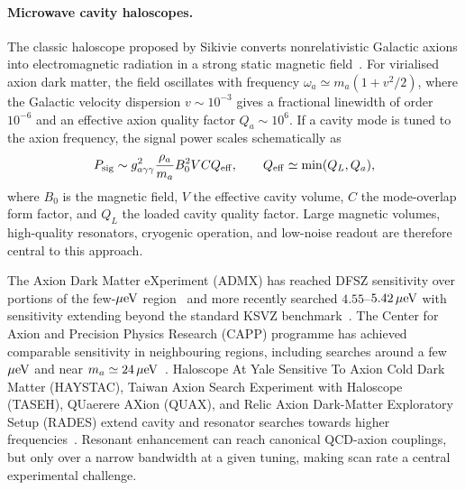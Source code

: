 \documentclass[review]{elsarticle}
\numberwithin{equation}{section}
\numberwithin{table}{section}
\numberwithin{figure}{section}
\begin{document}
\paragraph{Microwave cavity haloscopes.}

The classic haloscope proposed by Sikivie converts nonrelativistic Galactic axions into electromagnetic radiation in a strong static magnetic field~\cite{Sikivie:1983ip,Sikivie:1985yu}. For virialised axion dark matter, the field oscillates with frequency $\omega_a\simeq m_a(1+v^2/2)$, where the Galactic velocity dispersion $v\sim10^{-3}$ gives a fractional linewidth of order $10^{-6}$ and an effective axion quality factor $Q_a\sim10^6$. If a cavity mode is tuned to the axion frequency, the signal power scales schematically as
\begin{align}
    P_{\rm sig}
    \sim
    g_{a\gamma\gamma}^2
    \frac{\rho_a}{m_a}
    B_0^2 V C Q_{\rm eff},
    \qquad
    Q_{\rm eff}\simeq \min(Q_L,Q_a),
    \label{eq:axion-haloscope-power}
\end{align}
where $B_0$ is the magnetic field, $V$ the effective cavity volume, $C$ the mode-overlap form factor, and $Q_L$ the loaded cavity quality factor. Large magnetic volumes, high-quality resonators, cryogenic operation, and low-noise readout are therefore central to this approach.

The Axion Dark Matter eXperiment (ADMX) has reached DFSZ sensitivity over portions of the few-$\mu{\rm eV}$ region~\cite{ADMX:2021nhd} and more recently searched $4.55$--$5.42\,\mu{\rm eV}$ with sensitivity extending beyond the standard KSVZ benchmark~\cite{ADMX:2025vom}. The Center for Axion and Precision Physics Research (CAPP) programme has achieved comparable sensitivity in neighbouring regions, including searches around a few $\mu{\rm eV}$ and near $m_a\simeq24\,\mu{\rm eV}$~\cite{CAPP:2024dtx,Ahn:2025via}. Haloscope At Yale Sensitive To Axion Cold Dark Matter (HAYSTAC), Taiwan Axion Search Experiment with Haloscope (TASEH), QUaerere AXion (QUAX), and Relic Axion Dark-Matter Exploratory Setup (RADES) extend cavity and resonator searches towards higher frequencies~\cite{HAYSTAC:2024jch,TASEH:2022vvu,QUAX:2024fut,Ahyoune:2024klt,QUAX:2025wtb}. Resonant enhancement can reach canonical QCD-axion couplings, but only over a narrow bandwidth at a given tuning, making scan rate a central experimental challenge.
\end{document}

